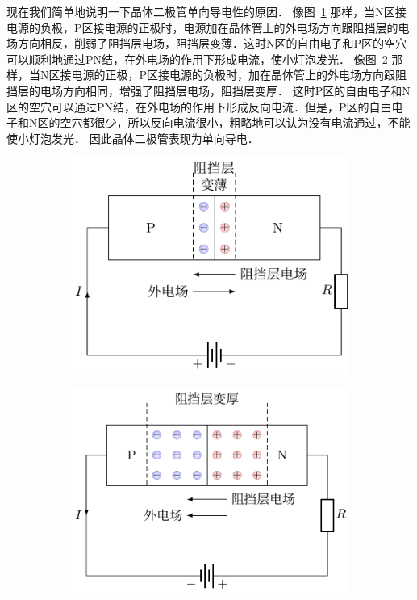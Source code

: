 现在我们简单地说明一下晶体二极管单向导电性的原因．
像图~\ref{fig_B_8-27a} 那样，当N区接电源的负极，P区接电源的正极时，电源加在晶体管上的外电场方向跟阻挡层的电场方向相反，削弱了阻挡层电场，阻挡层变薄．这时N区的自由电子和P区的空穴可以顺利地通过PN结，在外电场的作用下形成电流，使小灯泡发光．
像图~\ref{fig_B_8-27b} 那样，当N区接电源的正极，P区接电源的负极时，加在晶体管上的外电场方向跟阻挡层的电场方向相同，增强了阻挡层电场，阻挡层变厚．
这时P区的自由电子和N区的空穴可以通过PN结，在外电场的作用下形成反向电流．但是，P区的自由电子和N区的空穴都很少，所以反向电流很小，粗略地可以认为没有电流通过，不能使小灯泡发光．
因此晶体二极管表现为单向导电．
\begin{figure}[htbp]
    \centering
    \begin{subfigure}{0.48\linewidth}
        \centering
        \includegraphics{fig/B/8-27a.pdf}
        \caption{}\label{fig_B_8-27a}
    \end{subfigure}
    \hfil
    \begin{subfigure}{0.48\linewidth}
        \centering
        \includegraphics{fig/B/8-27b.pdf}
        \caption{}\label{fig_B_8-27b}
    \end{subfigure}
    \caption{}\label{fig_B_8-27}
\end{figure}

